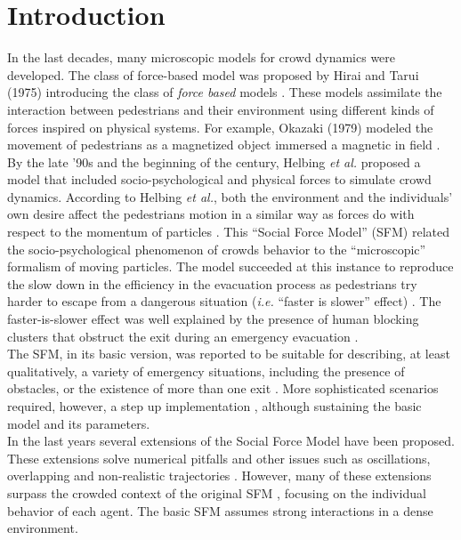 \documentclass[preprint,12pt]{elsarticle}
\begin{document}

\section{\label{introduction}Introduction}

In the last decades, many microscopic models 
for crowd dynamics were developed. The class of force-based model was proposed by Hirai 
and Tarui (1975) introducing the class of \textit{force based} models 
\cite{Hirai}. These models assimilate the interaction between 
pedestrians and their environment using different kinds of forces inspired on physical systems. For 
example, Okazaki (1979) modeled the movement of pedestrians as 
a magnetized object immersed a magnetic in field \cite{Okazaki}.\\

By the late '90s and the beginning of the century, Helbing 
\textit{et al.} proposed a model that included socio-psychological and physical 
forces to simulate crowd dynamics. According to Helbing \textit{et al.}, both 
the environment and the individuals' own desire affect the pedestrians motion in 
a similar way as forces do with respect to the momentum of particles 
\cite{Helbing1,Helbing4}. This ``Social Force Model'' (SFM) related the 
socio-psychological phenomenon of crowds behavior to the ``microscopic'' 
formalism of moving particles. The model succeeded at this instance to 
reproduce the slow down in the efficiency in the evacuation process as 
pedestrians try harder to escape from a dangerous situation (\textit{i.e.} 
``faster is slower'' effect) \cite{Helbing1,Dorso2}.
The faster-is-slower effect was well explained by the presence of human blocking clusters 
that obstruct the exit during an emergency evacuation \cite{Dorso1}.  \\ 

The SFM, in its basic version, was reported to be suitable for describing, 
at least qualitatively, a variety of emergency situations, including the presence
of obstacles, or the existence of more than one exit \cite{Dorso3,Dorso5}.
More sophisticated scenarios required, however, a step up implementation
\cite{Cornes1,Dorso4,Dorso6}, although sustaining the basic model and its parameters.  \\

In the last years several extensions of the Social Force Model have been 
proposed. These extensions solve numerical pitfalls \cite{koster1} 
and other issues such as oscillations, overlapping and non-realistic trajectories
\cite{chraibi1,dietrich1}. However, many of these extensions surpass the 
crowded context of the original SFM \cite{Helbing1,Helbing4}, focusing on the 
individual behavior of each agent. The basic SFM assumes strong interactions
in a dense environment.\\
\end{document}
